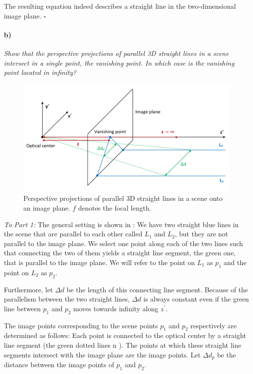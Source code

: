 \documentclass[a4paper,twocolumn]{article}
\newcommand{\subtask}[2]{\paragraph{#1)} \textit{#2} \newline}
\begin{document}
	The resulting equation indeed describes a straight line in the two-dimensional image plane. \hfill $\square$
	
	\subtask{b}{Show that the perspective projections of parallel 3D straight lines in a scene intersect in a single point, the vanishing point. In which case is the vanishing point located in infinity?}
	
	
	\begin{figure}
		\centering
		\includegraphics[width=\textwidth]{images/vanishing_point.png}
		\caption{Perspective projections of parallel 3D straight lines in a scene onto an image plane. $f$ denotes the focal length.}
		\label{fig:vanishing_point}
	\end{figure}
	
	
	\textit{To Part 1:}
	The general setting is shown in : We have two straight blue lines in the scene that are parallel to each other called $L_1$ and $L_2$, but they are not parallel to the image plane. We select one point along each of the two lines such that connecting the two of them yields a straight line segment, the green one, that is parallel to the image plane. We will refer to the point on $L_1$ as $p_1$ and the point on $L_2$ as $p_2$.
	
	Furthermore, let $\Delta d$ be the length of this connecting line segment. Because of the parallelism between the two straight lines, $\Delta d$ is always constant even if the green line between $p_1$ and $p_2$ moves towards infinity along $z^{\prime}$.
	
	The image points corresponding to the scene points $p_1$ and $p_2$ respectively are determined as follows: Each point is connected to the optical center by a straight line segment (the green dotted lines n ). The points at which these straight line segments intersect with the image plane are the image points. Let $\Delta d_p$ be the distance between the image points of $p_1$ and $p_2$.
	
\end{document}
